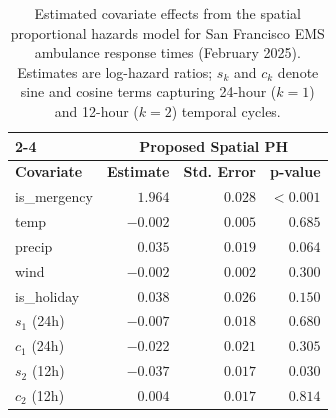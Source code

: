 \documentclass[11pt]{article}
\begin{document}
\begin{table}[H]

	\centering
    \small
	\begin{tabular}{l|rrr|}
		\cline{2-4}
		& \multicolumn{3}{c|}{Proposed Spatial PH} \\ \hline
		\multicolumn{1}{|l|}{\textbf{Covariate}} 
		& \multicolumn{1}{r|}{\textbf{Estimate}} 
		& \multicolumn{1}{r|}{\textbf{Std. Error}} 
		& \textbf{p-value} \\ \hline
		\multicolumn{1}{|l|}{is\_mergency} & \multicolumn{1}{r|}{$1.964$} & \multicolumn{1}{r|}{$0.028$} & $<0.001$ \\ \hline
		\multicolumn{1}{|l|}{temp}      & \multicolumn{1}{r|}{$-0.002$} & \multicolumn{1}{r|}{$0.005$} & $0.685$ \\ \hline
		\multicolumn{1}{|l|}{precip}    & \multicolumn{1}{r|}{$0.035$}  & \multicolumn{1}{r|}{$0.019$} & $0.064$ \\ \hline
		\multicolumn{1}{|l|}{wind}      & \multicolumn{1}{r|}{$-0.002$} & \multicolumn{1}{r|}{$0.002$} & $0.300$ \\ \hline
		\multicolumn{1}{|l|}{is\_holiday}& \multicolumn{1}{r|}{$0.038$}  & \multicolumn{1}{r|}{$0.026$} & $0.150$ \\ \hline
		\multicolumn{1}{|l|}{$s_1$ (24h)} & \multicolumn{1}{r|}{$-0.007$} & \multicolumn{1}{r|}{$0.018$} & $0.680$ \\ \hline
		\multicolumn{1}{|l|}{$c_1$ (24h)} & \multicolumn{1}{r|}{$-0.022$} & \multicolumn{1}{r|}{$0.021$} & $0.305$ \\ \hline
		\multicolumn{1}{|l|}{$s_2$ (12h)} & \multicolumn{1}{r|}{$-0.037$} & \multicolumn{1}{r|}{$0.017$} & $0.030$ \\ \hline
		\multicolumn{1}{|l|}{$c_2$ (12h)} & \multicolumn{1}{r|}{$0.004$}  & \multicolumn{1}{r|}{$0.017$} & $0.814$ \\ \hline
	\end{tabular}
\caption{Estimated covariate effects from the spatial proportional hazards model for San Francisco EMS ambulance response times (February 2025). Estimates are log-hazard ratios; $s_k$ and $c_k$ denote sine and cosine terms capturing 24-hour ($k=1$) and 12-hour ($k=2$) temporal cycles.}
\label{tab:sf_empirical_betas}
\end{table}
\end{document}
